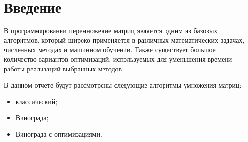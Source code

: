 \chapter*{Введение}

В программировании перемножение матриц является одним из базовых алгоритмов, который широко применяется в различных математических задачах, численных методах и машинном обучении.
Также существует большое количество вариантов оптимизаций, используемых для уменьшения времени работы реализаций выбранных методов.

В данном отчете будут рассмотрены следующие алгоритмы умножения матриц:
\begin{itemize}
    \item классический;
    \item Винограда;
    \item Винограда с оптимизациями.
\end{itemize}

